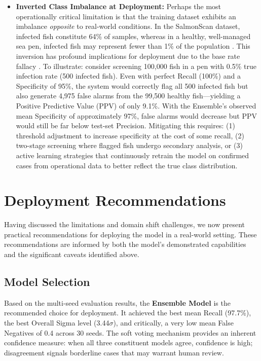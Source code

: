 \documentclass[12pt,a4paper]{article}
\begin{document}
\begin{itemize}
    \item \textbf{Inverted Class Imbalance at Deployment:} Perhaps the most operationally critical limitation is that the training dataset exhibits an imbalance \emph{opposite} to real-world conditions. In the SalmonScan dataset, infected fish constitute 64\% of samples, whereas in a healthy, well-managed sea pen, infected fish may represent fewer than 1\% of the population \citep{NVI_2025_NFHR2024}. This inversion has profound implications for deployment due to the base rate fallacy \citep{montgomery2020introduction}. To illustrate: consider screening 100,000 fish in a pen with 0.5\% true infection rate (500 infected fish). Even with perfect Recall (100\%) and a Specificity of 95\%, the system would correctly flag all 500 infected fish but also generate 4,975 false alarms from the 99,500 healthy fish---yielding a Positive Predictive Value (PPV) of only 9.1\%. With the Ensemble's observed mean Specificity of approximately 97\%, false alarms would decrease but PPV would still be far below test-set Precision. Mitigating this requires: (1) threshold adjustment to increase specificity at the cost of some recall, (2) two-stage screening where flagged fish undergo secondary analysis, or (3) active learning strategies that continuously retrain the model on confirmed cases from operational data to better reflect the true class distribution.
\end{itemize}

\section{Deployment Recommendations}
\label{sec:deployment}

Having discussed the limitations and domain shift challenges, we now present practical recommendations for deploying the model in a real-world setting. These recommendations are informed by both the model's demonstrated capabilities and the significant caveats identified above.

\subsection{Model Selection}
Based on the multi-seed evaluation results, the \textbf{Ensemble Model} is the recommended choice for deployment. It achieved the best mean Recall (97.7\%), the best Overall Sigma level (3.44$\sigma$), and critically, a very low mean False Negatives of 0.4 across 30 seeds. The soft voting mechanism provides an inherent confidence measure: when all three constituent models agree, confidence is high; disagreement signals borderline cases that may warrant human review.
\end{document}

